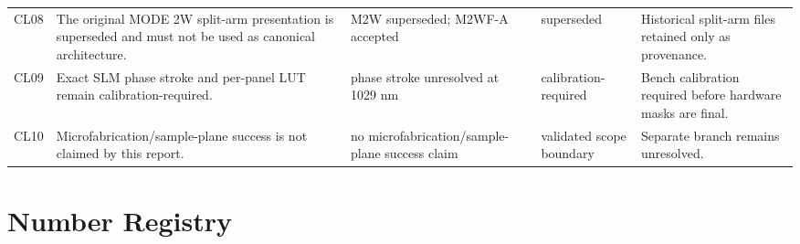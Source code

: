\documentclass[11pt,a4paper]{report}
\begin{document}
\begin{longtable}{p{}p{}p{}p{}p{}}
CL08 & The original MODE 2W split-arm presentation is superseded and must not be used as canonical architecture. & M2W superseded; M2WF-A accepted & superseded & Historical split-arm files retained only as provenance.\\
CL09 & Exact SLM phase stroke and per-panel LUT remain calibration-required. & phase stroke unresolved at 1029 nm & calibration-required & Bench calibration required before hardware masks are final.\\
CL10 & Microfabrication/sample-plane success is not claimed by this report. & no microfabrication/sample-plane success claim & validated scope boundary & Separate branch remains unresolved.\\
\bottomrule
\end{longtable}

\chapter{Number Registry}
\end{document}
